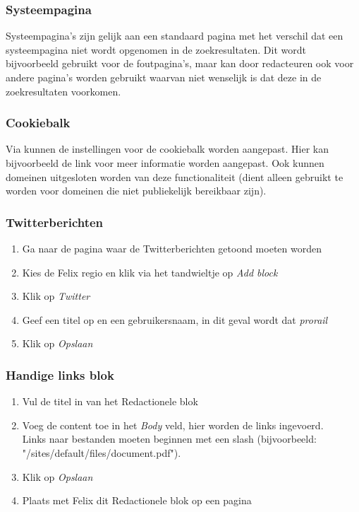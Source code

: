 \subsubsection{Systeempagina}
Systeempagina's zijn gelijk aan een standaard pagina met het verschil dat een systeempagina niet wordt opgenomen in de zoekresultaten. Dit wordt bijvoorbeeld gebruikt voor de foutpagina's, maar kan door redacteuren ook voor andere pagina's worden gebruikt waarvan niet wenselijk is dat deze in de zoekresultaten voorkomen.

\subsubsection{Cookiebalk}
Via  kunnen de instellingen voor de cookiebalk worden aangepast. Hier kan bijvoorbeeld de link voor meer informatie worden aangepast. Ook kunnen domeinen uitgesloten worden van deze functionaliteit (dient alleen gebruikt te worden voor domeinen die niet publiekelijk bereikbaar zijn).

\subsubsection{Twitterberichten}
\begin{enumerate}
\item Ga naar de pagina waar de Twitterberichten getoond moeten worden
\item Kies de Felix regio en klik via het tandwieltje op \emph{Add block}
\item Klik op \emph{Twitter}
\item Geef een titel op en een gebruikersnaam, in dit geval wordt dat \emph{prorail}
\item Klik op \emph{Opslaan}
\end{enumerate}

\subsubsection{Handige links blok}
\begin{enumerate}
\item Vul de titel in van het Redactionele blok
\item Voeg de content toe in het \emph{Body} veld, hier worden de links ingevoerd. \\
Links naar bestanden moeten beginnen met een slash (bijvoorbeeld: \\ "/sites/default/files/document.pdf").
\item Klik op \emph{Opslaan}
\item Plaats met Felix dit Redactionele blok op een pagina
\end{enumerate}

